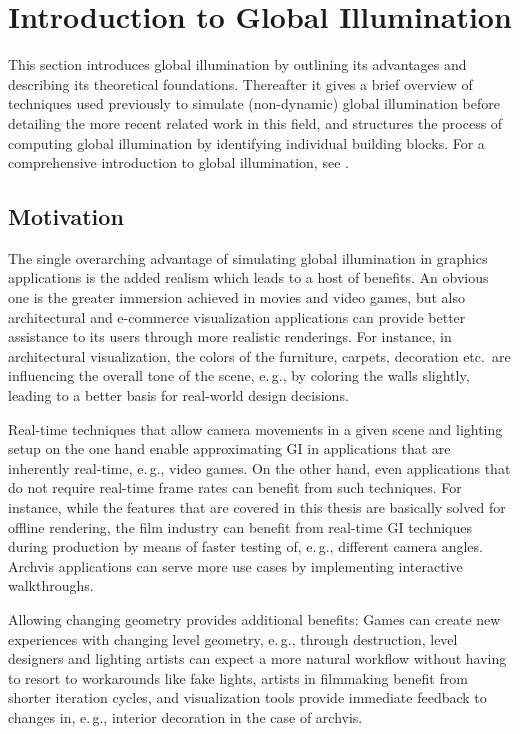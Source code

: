 \section{Introduction to Global Illumination}

This section introduces global illumination by outlining its advantages and describing its theoretical foundations. Thereafter it gives a brief overview of techniques used previously to simulate (non-dynamic) global illumination before detailing the more recent related work in this field, and structures the process of computing global illumination by identifying individual building blocks. For a comprehensive introduction to global illumination, see \citet{Ritschel:2012:GISTAR}.

\subsection{Motivation}
The single overarching advantage of simulating global illumination in graphics applications is the added realism which leads to a host of benefits. An obvious one is the greater immersion achieved in movies and video games, but also architectural and e-commerce visualization applications can provide better assistance to its users through more realistic renderings. For instance, in architectural visualization, the colors of the furniture, carpets, decoration etc.\ are influencing the overall tone of the scene, e.\,g., by coloring the walls slightly, leading to a better basis for real-world design decisions.

Real-time techniques that allow camera movements in a given scene and lighting setup on the one hand enable approximating GI in applications that are inherently real-time, e.\,g., video games. On the other hand, even applications that do not require real-time frame rates can benefit from such techniques. For instance, while the features that are covered in this thesis are basically solved for offline rendering, the film industry can benefit from real-time GI techniques during production by means of faster testing of, e.\,g., different camera angles. Archvis applications can serve more use cases by implementing interactive walkthroughs.

Allowing changing geometry provides additional benefits: Games can create new experiences with changing level geometry, e.\,g., through destruction, level designers and lighting artists can expect a more natural workflow without having to resort to workarounds like fake lights, artists in filmmaking benefit from shorter iteration cycles, and visualization tools provide immediate feedback to changes in, e.\,g., interior decoration in the case of archvis.


